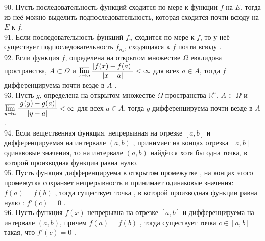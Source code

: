 \documentclass[12pt]{article}
\begin{document}
{90. Пусть последовательность функций сходится по мере к функции ${\displaystyle f}$ на ${\displaystyle E}$, тогда из неё можно выделить подпоследовательность, которая сходится почти всюду на ${\displaystyle E}$ к ${\displaystyle f}$.\\

91. Если последовательность функций ${\displaystyle f_n}$ сходится по мере к ${\displaystyle f}$, то у неё существует подпоследовательность ${\displaystyle f_{n_k}}$, сходящаяся к ${\displaystyle f}$ почти всюду .\\

92. Если функция ${\displaystyle f}$, определена на открытом множестве ${\displaystyle \Omega }$ евклидова пространства, ${\displaystyle A\subset \Omega }$ и ${\displaystyle \varlimsup _{x\to a}{\frac {|f(x)-f(a)|}{|x-a|}}<\infty }$ для всех ${\displaystyle a\in A}$, тогда ${\displaystyle f}$ дифференцируема почти везде в ${\displaystyle A}$ .\\

93. Пусть ${\displaystyle g}$, определена на открытом множестве ${\displaystyle \Omega }$ пространства ${\displaystyle \mathbb {R} ^{n}}$, ${\displaystyle A\subset \Omega }$ и ${\displaystyle \varlimsup _{y\to a}{\frac {|g(y)-g(a)|}{|y-a|}}<\infty }$ для всех ${\displaystyle a\in A}$, тогда ${\displaystyle g}$ дифференцируема почти везде в ${\displaystyle A}$ .\\

94. Если вещественная функция, непрерывная на отрезке ${\displaystyle [a,b]}$ и дифференцируемая на интервале ${\displaystyle (a,b)}$ , принимает на концах отрезка ${\displaystyle [a,b]}$ одинаковые значения, то на интервале ${\displaystyle (a,b)}$ найдётся хотя бы одна точка, в которой производная функции равна нулю.\\

95. Пусть функция  дифференцируема в открытом промежутке , на концах этого промежутка сохраняет непрерывность и принимает одинаковые значения: ${\displaystyle f(a)=f(b)}$ , тогда существует точка  , в которой производная функции  равна нулю : ${\displaystyle f'(c)=0}$  .\\

96. Пусть функция ${\displaystyle f(x)}$ непрерывна на отрезке ${\displaystyle [a,b]}$ и дифференцируема на интервале ${\displaystyle (a,b)}$, причем ${\displaystyle f(a)=f(b)}$ , тогда существует точка ${\displaystyle c \in [a, b]}$ такая, что ${\displaystyle f'(c)=0}$ .\\

}
\end{document}
